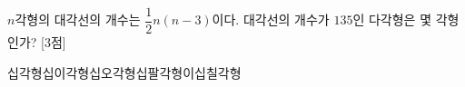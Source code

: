 $n$각형의 대각선의 개수는 $\dfrac{1}{2}n(n-3)$이다. 대각선의 개수가 $135$인 다각형은 몇 각형인가? \mbox{[3점]}
\begin{choices32}{십각형}{십이각형}{십오각형}{십팔각형}{이십칠각형}\end{choices32}
